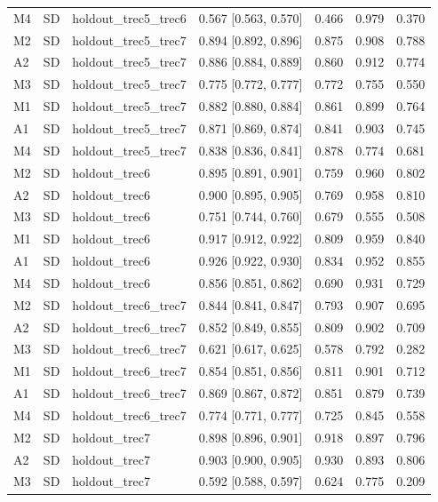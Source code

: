 \begin{table}[!htbp]
\begin{tabular}{lllcccc}
M4 & SD & holdout\_trec5\_trec6 & 0.567 [0.563, 0.570] & 0.466 & 0.979 & 0.370 \\
M2 & SD & holdout\_trec5\_trec7 & 0.894 [0.892, 0.896] & 0.875 & 0.908 & 0.788 \\
A2 & SD & holdout\_trec5\_trec7 & 0.886 [0.884, 0.889] & 0.860 & 0.912 & 0.774 \\
M3 & SD & holdout\_trec5\_trec7 & 0.775 [0.772, 0.777] & 0.772 & 0.755 & 0.550 \\
M1 & SD & holdout\_trec5\_trec7 & 0.882 [0.880, 0.884] & 0.861 & 0.899 & 0.764 \\
A1 & SD & holdout\_trec5\_trec7 & 0.871 [0.869, 0.874] & 0.841 & 0.903 & 0.745 \\
M4 & SD & holdout\_trec5\_trec7 & 0.838 [0.836, 0.841] & 0.878 & 0.774 & 0.681 \\
M2 & SD & holdout\_trec6 & 0.895 [0.891, 0.901] & 0.759 & 0.960 & 0.802 \\
A2 & SD & holdout\_trec6 & 0.900 [0.895, 0.905] & 0.769 & 0.958 & 0.810 \\
M3 & SD & holdout\_trec6 & 0.751 [0.744, 0.760] & 0.679 & 0.555 & 0.508 \\
M1 & SD & holdout\_trec6 & 0.917 [0.912, 0.922] & 0.809 & 0.959 & 0.840 \\
A1 & SD & holdout\_trec6 & 0.926 [0.922, 0.930] & 0.834 & 0.952 & 0.855 \\
M4 & SD & holdout\_trec6 & 0.856 [0.851, 0.862] & 0.690 & 0.931 & 0.729 \\
M2 & SD & holdout\_trec6\_trec7 & 0.844 [0.841, 0.847] & 0.793 & 0.907 & 0.695 \\
A2 & SD & holdout\_trec6\_trec7 & 0.852 [0.849, 0.855] & 0.809 & 0.902 & 0.709 \\
M3 & SD & holdout\_trec6\_trec7 & 0.621 [0.617, 0.625] & 0.578 & 0.792 & 0.282 \\
M1 & SD & holdout\_trec6\_trec7 & 0.854 [0.851, 0.856] & 0.811 & 0.901 & 0.712 \\
A1 & SD & holdout\_trec6\_trec7 & 0.869 [0.867, 0.872] & 0.851 & 0.879 & 0.739 \\
M4 & SD & holdout\_trec6\_trec7 & 0.774 [0.771, 0.777] & 0.725 & 0.845 & 0.558 \\
M2 & SD & holdout\_trec7 & 0.898 [0.896, 0.901] & 0.918 & 0.897 & 0.796 \\
A2 & SD & holdout\_trec7 & 0.903 [0.900, 0.905] & 0.930 & 0.893 & 0.806 \\
M3 & SD & holdout\_trec7 & 0.592 [0.588, 0.597] & 0.624 & 0.775 & 0.209 \\

\end{tabular}
\end{table}
